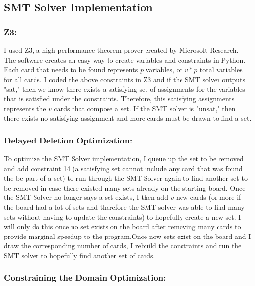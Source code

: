 \documentclass[pageno]{jpaper}
\begin{document}
\subsection{SMT Solver Implementation}


\subsubsection{Z3:}
I used Z3, a high performance theorem prover created by Microsoft Research. The software creates an easy way to create variables and constraints in Python. Each card that needs to be found represents $p$ variables, or $v*p$ total variables for all cards. I coded the above constraints in Z3 and if the SMT solver outputs "sat," then we know there exists a satisfying set of assignments for the variables that is satisfied under the constraints. Therefore, this satisfying assignments represents the $v$ cards that compose a set. If the SMT solver is "unsat," then there exists no satisfying assignment and more cards must be drawn to find a set. 

\subsubsection{Delayed Deletion Optimization:}

To optimize the SMT Solver implementation, I queue up the set to be removed and add constraint 14 (a satisfying set cannot include any card that was found the be part of a set) to run through the SMT Solver again to find another set to be removed in case there existed many sets already on the starting board. Once the SMT Solver no longer says a set exists, I then add $v$ new cards (or more if the board had a lot of sets and therefore the SMT solver was able to find many sets without having to update the constraints) to hopefully create a new set. I will only do this once no set exists on the board after removing many cards to provide marginal speedup to the program.Once now sets exist on the board and I draw the corresponding number of cards, I rebuild the constraints and run the SMT solver to hopefully find another set of cards. 


\subsubsection{Constraining the Domain Optimization:}
\end{document}
